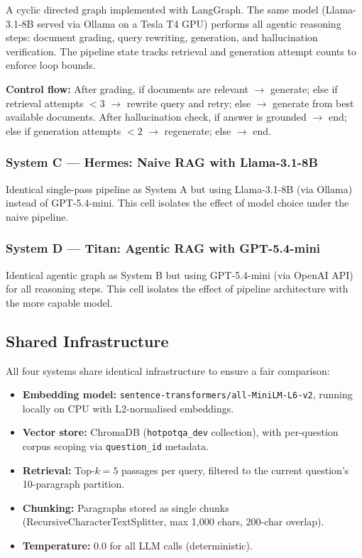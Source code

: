 \documentclass[12pt]{article}
\begin{document}
A cyclic directed graph implemented with LangGraph.  The same model
(Llama-3.1-8B served via Ollama on a Tesla T4 GPU) performs all agentic
reasoning steps: document grading, query rewriting, generation, and
hallucination verification.  The pipeline state tracks retrieval and generation
attempt counts to enforce loop bounds.

\textbf{Control flow:} After grading, if documents are relevant $\rightarrow$
generate; else if retrieval attempts $< 3$ $\rightarrow$ rewrite query and
retry; else $\rightarrow$ generate from best available documents.  After
hallucination check, if answer is grounded $\rightarrow$ end; else if
generation attempts $< 2$ $\rightarrow$ regenerate; else $\rightarrow$ end.

\subsubsection{System C --- Hermes: Naive RAG with Llama-3.1-8B}

Identical single-pass pipeline as System A but using Llama-3.1-8B (via Ollama)
instead of GPT-5.4-mini.  This cell isolates the effect of model choice under
the naive pipeline.

\subsubsection{System D --- Titan: Agentic RAG with GPT-5.4-mini}

Identical agentic graph as System B but using GPT-5.4-mini (via OpenAI API)
for all reasoning steps.  This cell isolates the effect of pipeline architecture
with the more capable model.

\subsection{Shared Infrastructure}

All four systems share identical infrastructure to ensure a fair comparison:

\begin{itemize}
    \item \textbf{Embedding model:} \texttt{sentence-transformers/all-MiniLM-L6-v2},
          running locally on CPU with L2-normalised embeddings.
    \item \textbf{Vector store:} ChromaDB (\texttt{hotpotqa\_dev} collection),
          with per-question corpus scoping via \texttt{question\_id} metadata.
    \item \textbf{Retrieval:} Top-$k=5$ passages per query, filtered to the
          current question's 10-paragraph partition.
    \item \textbf{Chunking:} Paragraphs stored as single chunks
          (RecursiveCharacterTextSplitter, max 1{,}000 chars, 200-char overlap).
    \item \textbf{Temperature:} 0.0 for all LLM calls (deterministic).
\end{itemize}
\end{document}
